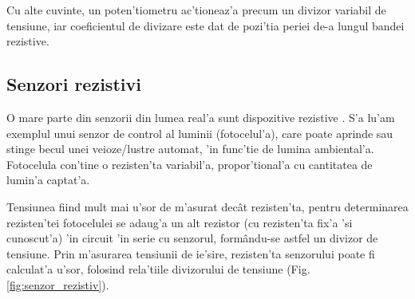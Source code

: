Cu alte cuvinte, un poten'tiometru ac'tioneaz'a precum un divizor variabil de tensiune, iar coeficientul de divizare este dat de pozi'tia periei de-a lungul bandei rezistive.
%
%

\subsection*{Senzori rezistivi}

O mare parte din senzorii din lumea real'a sunt dispozitive rezistive \cite{aplicatii_senzori_rezistivi}. S'a lu'am exemplul unui senzor de control al luminii (fotocelul'a), care poate aprinde sau stinge becul unei veioze/lustre automat, 'in func'tie de lumina ambiental'a. Fotocelula con'tine o rezisten'ta variabil'a, propor'tional'a cu cantitatea de lumin'a captat'a.

Tensiunea fiind mult mai u'sor de m'asurat dec\^at rezisten'ta, pentru determinarea rezisten'tei fotocelulei se adaug'a un alt rezistor (cu rezisten'ta fix'a 'si cunoscut'a) 'in circuit 'in serie cu senzorul, form\^andu-se astfel un divizor de tensiune. Prin m'asurarea tensiunii de ie'sire, rezisten'ta senzorului poate fi calculat'a u'sor, folosind rela'tiile divizorului de tensiune (Fig. \ref{fig:senzor_rezistiv}).

